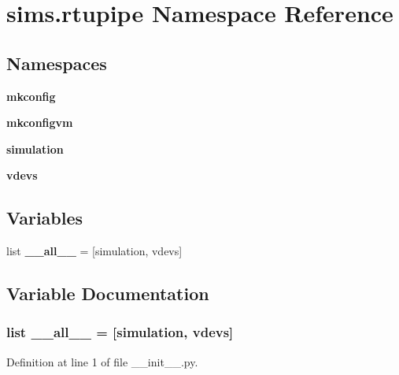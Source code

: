 \section{sims.\+rtupipe Namespace Reference}
\label{namespacesims_1_1rtupipe}
\subsection*{Namespaces}
\begin{DoxyCompactItemize}
\item 
 {\bf mkconfig}
\item 
 {\bf mkconfigvm}
\item 
 {\bf simulation}
\item 
 {\bf vdevs}
\end{DoxyCompactItemize}
\subsection*{Variables}
\begin{DoxyCompactItemize}
\item 
list {\bf \+\_\+\+\_\+all\+\_\+\+\_\+} = [\textquotesingle{}simulation\textquotesingle{}, \textquotesingle{}vdevs\textquotesingle{}]
\end{DoxyCompactItemize}


\subsection{Variable Documentation}
\subsubsection[{\+\_\+\+\_\+all\+\_\+\+\_\+}]{\setlength{\rightskip}{0pt plus 5cm}list \+\_\+\+\_\+all\+\_\+\+\_\+ = [\textquotesingle{}simulation\textquotesingle{}, \textquotesingle{}vdevs\textquotesingle{}]}\label{namespacesims_1_1rtupipe_aa4a022e6ddacd362b83964da5cc5d044}


Definition at line 1 of file \+\_\+\+\_\+init\+\_\+\+\_\+.\+py.

